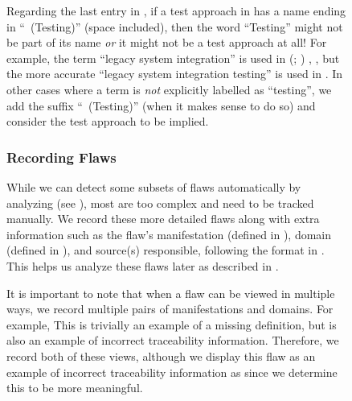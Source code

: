\begin{figure}[h!]
\ifnotpaper
    Regarding the last entry in , if a test approach in
    \ourApproachGlossary{} has a name ending in ``~(Testing)'' (space
    included), then the word ``Testing'' might not be part of its name
    \emph{or} it might not be a test approach at all! For example, the term
    ``legacy system integration'' is used in \ifnotpaper
        \citeauthor{Gerrard2000a} (\citeyear[pp.~12\==13, Tab.~2]{Gerrard2000a};
        \citeyear[Tab.~1]{Gerrard2000b})\else
        \cite[pp.~12\==13, Tab.~2]{Gerrard2000a},
        \cite[Tab.~1]{Gerrard2000b}\fi, but the more accurate
    ``legacy system integration testing'' is used in
    \citeyearpar[pp.~30\==31]{Gerrard2000b}. In other cases where a
    term is \emph{not} explicitly labelled as ``testing'', we add the
    suffix ``~(Testing)'' (when it makes sense to do so) and consider
    the test approach to be implied.

    

    \subsubsection{Recording Flaws}\label{record-flaws}
    While we can detect some subsets of flaws automatically by analyzing
    \ourApproachGlossary{} (see ), most
    are too complex and need to be tracked manually. We record these more
    detailed flaws %
    along with extra information such as the flaw's manifestation (defined in
    ), domain (defined in ), and source(s)
    responsible, following the format in . This
    helps us analyze these flaws later as described in
    .

    \label{multi-view-flaws}
    It is important to note that when a flaw can be viewed in multiple ways,
    we record multiple pairs of manifestations and domains. For example,%
    \seeRefMissing*{} This is trivially an example of a missing definition,
    but is also an example of incorrect traceability information. Therefore,
    we record both of these views, although
    we display this flaw as an example of incorrect traceability information as
     since we determine this to be more meaningful.
    \newpage
\fi


\end{figure}
